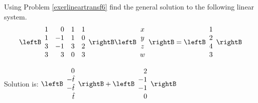 \begin{enumialphparenastyle}
\begin{ex} Using Problem \ref{exerlineartransf6} find the general solution to the
following linear system.
\begin{equation*}
\leftB
\begin{array}{rrrr}
1 & 0 & 1 & 1 \\
1 & -1 & 1 & 0 \\
3 & -1 & 3 & 2 \\
3 & 3 & 0 & 3
\end{array}
\rightB \leftB
\begin{array}{c}
x \\
y \\
z \\
w
\end{array}
\rightB =\leftB
\begin{array}{r}
1 \\
2 \\
4 \\
3
\end{array}
\rightB 
\end{equation*}
\begin{sol}
Solution is: $\leftB
\begin{array}{r}
0 \\
-\hat{t} \\
-\hat{t} \\
\hat{t}
\end{array}
\rightB +\leftB
\begin{array}{r}
2 \\
-1 \\
-1 \\
0
\end{array}
\rightB $
\end{sol}
\end{ex}


\end{enumialphparenastyle}
